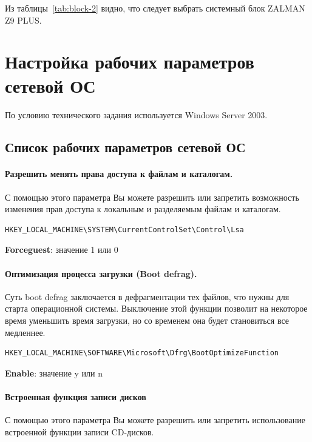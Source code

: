 \documentclass[russian,utf8,emptystyle]{eskdtext}
\begin{document}
Из таблицы~\ref{tab:block-2} видно, что следует выбрать системный блок ZALMAN Z9 PLUS.

\clearpage
\section{Настройка рабочих параметров сетевой ОС}

По условию технического задания используется Windows Server 2003.

\subsection{Список рабочих параметров сетевой ОС}

\paragraph{Разрешить менять права доступа к файлам и каталогам.}

С помощью этого параметра Вы можете разрешить или запретить возможность изменения прав доступа к локальным и разделяемым файлам и каталогам.

\begin{verbatim}
HKEY_LOCAL_MACHINE\SYSTEM\CurrentControlSet\Control\Lsa
\end{verbatim}

\textbf{Forceguest}: значение 1 или 0


\paragraph{Оптимизация процесса загрузки (Boot defrag).}

Суть boot defrag заключается в дефрагментации тех файлов, что нужны для старта операционной системы. Выключение этой функции позволит на некоторое время уменьшить время загрузки, но со временем она будет становиться все медленнее.

\begin{verbatim}
HKEY_LOCAL_MACHINE\SOFTWARE\Microsoft\Dfrg\BootOptimizeFunction
\end{verbatim}

\textbf{Enable}: значение y или n    


\paragraph{Встроенная функция записи дисков}

С помощью этого параметра Вы можете разрешить или запретить использование встроенной функции записи CD-дисков.
\end{document}
